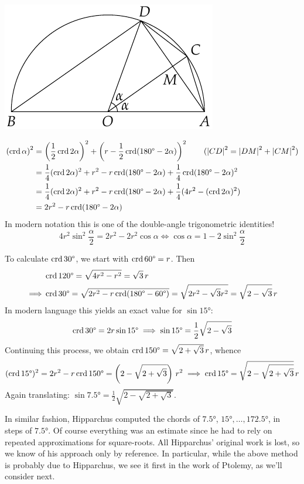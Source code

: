 \hfill
\begin{minipage}[t]{0.39\linewidth}\vspace{0pt}
	\flushright\includegraphics[scale=0.95]{trig-double}
\end{minipage}
\begin{align*}
	\left(\crd\alpha\right)^2&=\left(\frac 12\crd 2\alpha\right)^2+\left(r-\frac 12\crd(\ang{180}-2\alpha)\right)^2 \tag{$\nm{CD}^2=\nm{DM}^2+\nm{CM}^2$}\\
	&=\frac 14(\crd 2\alpha)^2+r^2-r\crd(\ang{180}-2\alpha)+\frac 14\crd(\ang{180}-2\alpha)^2\\
	&=\frac 14(\crd 2\alpha)^2+r^2-r\crd(\ang{180}-2\alpha)+\frac 14(4r^2-(\crd 2\alpha)^2)\\
	&=2r^2-r\crd(\ang{180}-2\alpha)
\end{align*}
In modern notation this is one of the double-angle trigonometric identities!
\[
	4r^2\sin^2\frac\alpha 2 =2r^2-2r^2\cos\alpha\iff \cos\alpha=1-2\sin^2\frac\alpha 2
\]
\goodbreak


 To calculate $\crd \ang{30}$, we start with $\crd\ang{60}=r$. Then
\begin{align*}
	&\crd\ang{120} =\sqrt{4r^2-r^2} =\sqrt 3\,r\\
	\implies &\crd\ang{30} =\sqrt{2r^2-r\crd(\ang{180}-\ang{60})}
		=\sqrt{2r^2-\sqrt 3r^2} =\sqrt{2-\sqrt 3}\,r
\end{align*}
In modern language this yields an exact value for $\sin\ang{15}$:
\[
	\crd\ang{30} =2r\sin\ang{15}
	\implies\sin\ang{15} =\frac 12\sqrt{2-\sqrt 3}
\]
Continuing this process, we obtain $\crd \ang{150}=\sqrt{2+\sqrt 3}\,r$, whence
\[
	(\crd\ang{15})^2 =2r^2-r\crd\ang{150}
	=\left(2-\sqrt{2+\sqrt 3}\right)\,r^2
	\implies \crd\ang{15} =\sqrt{2-\sqrt{2+\sqrt 3}}\,r
\]
Again translating: $\sin\ang{7.5}=\frac 12\sqrt{2-\sqrt{2+\sqrt 3}}$.\smallbreak

In similar fashion, Hipparchus computed the chords of $\ang{7.5}$, $\ang{15},\ldots,\ang{172.5}$, in steps of $\ang{7.5}$. Of course everything was an estimate since he had to rely on repeated approximations for square-roots. All Hipparchus' original work is lost, so we know of his approach only by reference. In particular, while the above method is probably due to Hipparchus, we see it first in the work of Ptolemy, as we'll consider next.



